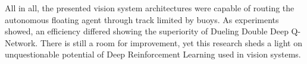 All in all, the presented vision system architectures were capable of routing the autonomous floating agent through track limited
by buoys. As experiments showed, an efficiency differed showing the superiority of Dueling Double Deep Q-Network. There is still a room
for improvement, yet this research sheds a light on unquestionable potential of Deep Reinforcement Learning used in vision systems.
